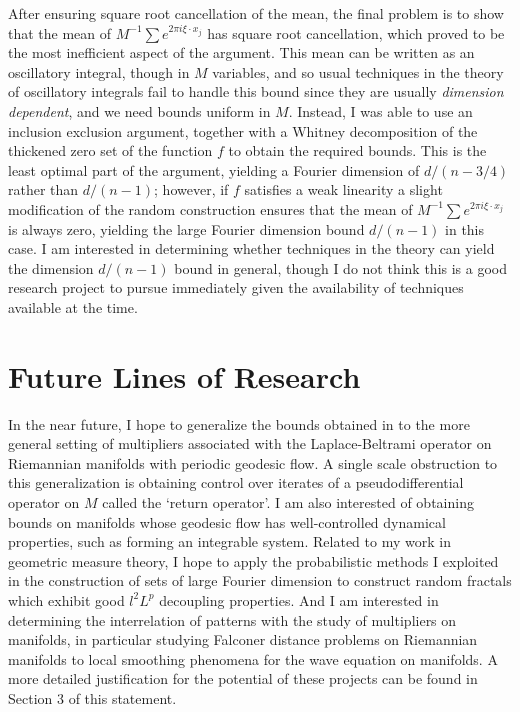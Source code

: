 \documentclass[11pt]{article}
\begin{document}
After ensuring square root cancellation of the mean, the final problem is to show that the mean of $M^{-1} \sum e^{2 \pi i \xi \cdot x_j}$ has square root cancellation, which proved to be the most inefficient aspect of the argument. This mean can be written as an oscillatory integral, though in $M$ variables, and so usual techniques in the theory of oscillatory integrals fail to handle this bound since they are usually \emph{dimension dependent}, and we need bounds uniform in $M$. Instead, I was able to use an inclusion exclusion argument, together with a Whitney decomposition of the thickened zero set of the function $f$ to obtain the required bounds. This is the least optimal part of the argument, yielding a Fourier dimension of $d/(n-3/4)$ rather than $d/(n-1)$; however, if $f$ satisfies a weak linearity a slight modification of the random construction ensures that the mean of $M^{-1} \sum e^{2 \pi i \xi \cdot x_j}$ is always zero, yielding the large Fourier dimension bound $d/(n-1)$ in this case. I am interested in determining whether techniques in the theory can yield the dimension $d/(n-1)$ bound in general, though I do not think this is a good research project to pursue immediately given the availability of techniques available at the time.

\section{Future Lines of Research} \label{Section3}

In the near future, I hope to generalize the bounds obtained in \cite{DensonCharacterization} to the more general setting of multipliers associated with the Laplace-Beltrami operator on Riemannian manifolds with periodic geodesic flow. A single scale obstruction to this generalization is obtaining control over iterates of a pseudodifferential operator on $M$ called the `return operator'.
I am also interested of obtaining bounds on manifolds whose geodesic flow has well-controlled dynamical properties, such as forming an integrable system. Related to my work in geometric measure theory, I hope to apply the probabilistic methods I exploited in the construction of sets of large Fourier dimension to construct random fractals which exhibit good $l^2L^p$ decoupling properties. And I am interested in determining the interrelation of patterns with the study of multipliers on manifolds, in particular studying Falconer distance problems on Riemannian manifolds to local smoothing phenomena for the wave equation on manifolds. A more detailed justification for the potential of these projects can be found in Section 3 of this statement.
\end{document}
